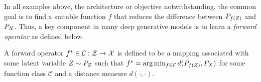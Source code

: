 %
In all examples above, the architecture or objective notwithstanding, the common goal is to find a suitable function $f$ that reduces the difference between $P_{f(\var{Z})}$ and $P_{\var{X}}$. 
%
%
%
%
Thus, a key component in many deep generative models 
is to learn a \textit{forward operator} as defined below.
\begin{definition}
\label{def:forward}
A forward operator $f^\star \in \mathcal{C}: \mathcal{Z} \to \mathcal{X}$ is defined to be a mapping associated with some latent variable ${\var{z}} \sim P_{\var{z}}$ such that $f^\star = \arg \min_{f \in \mathcal{C}} d(P_{f(\var{z})}, P_{\var{x}})$ for some function class $\mathcal{C}$ and a distance measure $d(\cdot,\cdot)$.
\end{definition}



